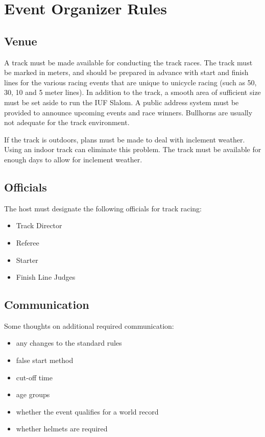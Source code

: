 \chapter{Event Organizer Rules}

\section{Venue}

A track must be made available for conducting the track races.
The track must be marked in meters, and should be prepared in advance with start and finish lines for the various racing events that are unique to unicycle racing (such as 50, 30, 10 and 5 meter lines).
In addition to the track, a smooth area of sufficient size must be set aside to run the IUF Slalom.
A public address system must be provided to announce upcoming events and race winners.
Bullhorns are usually not adequate for the track environment.

If the track is outdoors, plans must be made to deal with inclement weather.
Using an indoor track can eliminate this problem.
The track must be available for enough days to allow for inclement weather.

\section{Officials}

The host must designate the following officials for track racing:
\begin{itemize}
\item Track Director
\item Referee
\item Starter
\item Finish Line Judges
\end{itemize}

\section{Communication}

\begin{comment-2016}
Some thoughts on additional required communication:
\begin{itemize}
\item any changes to the standard rules
\item false start method
\item cut-off time
\item age groups
\item whether the event qualifies for a world record
\item whether helmets are required
\end{itemize}
\end{comment-2016}

